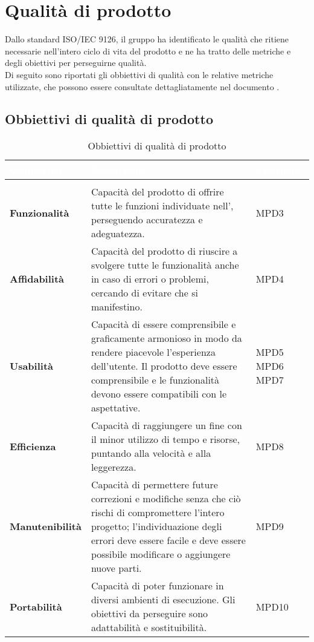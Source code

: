 \section{Qualità di prodotto}
Dallo standard ISO/IEC 9126, il gruppo \Gruppo{} ha identificato le qualità che ritiene necessarie nell'intero ciclo di vita del prodotto e ne ha tratto delle metriche e degli obiettivi per perseguirne qualità.\\
Di seguito sono riportati gli obbiettivi di qualità con le relative metriche utilizzate, che possono essere consultate dettagliatamente nel documento .


\subsection{Obbiettivi di qualità di prodotto}
\renewcommand{\arraystretch}{1.5}
\begin{longtable}{C{3cm} | C{9.5cm} | C{2.5cm}}
\textcolor{white}{\textbf{Obbiettivo}}&
\textcolor{white}{\textbf{Descrizione}}&
\textcolor{white}{\textbf{Metriche}} \\
\endfirsthead
{}\\
\endfoot
{}\caption{Obbiettivi di qualità di prodotto}
\endlastfoot
	
	\textbf{Funzionalità} & 
	Capacità del prodotto di offrire tutte le funzioni individuate nell'\AdRv{}, perseguendo accuratezza e adeguatezza. &
	MPD3 \\
	
	\textbf{Affidabilità} &
	 Capacità del prodotto di riuscire a svolgere tutte le funzionalità anche in caso di errori o problemi, cercando di evitare che si manifestino. &
	MPD4 \\
	
	\textbf{Usabilità} &
	Capacità di essere comprensibile e graficamente armonioso in modo da rendere piacevole l'esperienza dell'utente. Il prodotto deve essere comprensibile e le funzionalità devono essere compatibili con le aspettative. &
    MPD5 \newline MPD6 \newline MPD7 \\
    
	\textbf{Efficienza} & 
	Capacità di raggiungere un fine con il minor utilizzo di tempo e risorse, puntando alla velocità e alla leggerezza. &
	MPD8 \\
	
	\textbf{Manutenibilità} & 
	Capacità di permettere future correzioni e modifiche senza che ciò rischi di compromettere l'intero progetto; l'individuazione degli errori deve essere facile e deve essere possibile modificare o aggiungere nuove parti. &
 	MPD9 \\
 	
	\textbf{Portabilità} & 
	Capacità di poter funzionare in diversi ambienti di esecuzione. Gli obiettivi da perseguire sono adattabilità e sostituibilità. &
	MPD10 \\
	
\end{longtable}	

